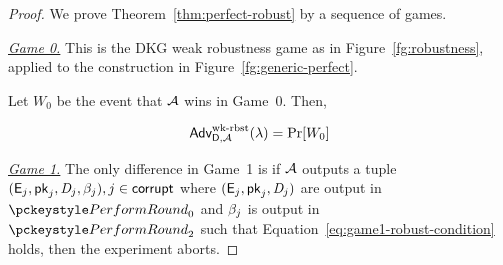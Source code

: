 \begin{proof}

We prove Theorem~\ref{thm:perfect-robust} by a sequence of games.

\medskip

\noindent \textit{\underline{Game 0.}}
This is the DKG weak robustness game as in Figure~\ref{fg:robustness},
applied to the construction in Figure~\ref{fg:generic-perfect}.

Let $W_0$ be the event that $\mathcal{A}$ wins in Game~0. Then,

\[
    \textsf{\upshape Adv}^{\textrm{\upshape wk-rbst}}_{\mathsf{D},\mathcal{A}}(\lambda) = \Pr[W_0]
\]


%
%
%
%

\medskip

\noindent \textit{\underline{Game 1.}}
The only difference in Game~1 is if $\mathcal{A}$ outputs a tuple $(\mathsf{E}_j, \mathsf{pk}_j,\textit{D}_j,\beta_j), j \in \mathsf{corrupt}$
where $(\mathsf{E}_j, \mathsf{pk}_j,\textit{D}_j)$ are output in $\dkgkeygen_0$
and $\beta_j$ is output in $\dkgkeygen_2$
such that Equation~\ref{eq:game1-robust-condition} holds,
then the experiment aborts.


\end{proof}
